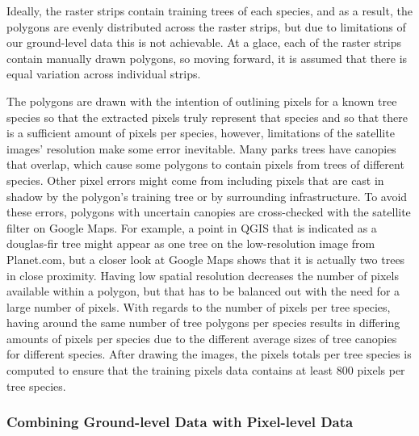 \documentclass[12pt,twoside]{reedthesis}
\begin{document}
Ideally, the raster strips contain training trees of each species, and as a result, the polygons are evenly distributed across the raster strips, but due to limitations of our ground-level data this is not achievable. At a glace, each of the raster strips contain manually drawn polygons, so moving forward, it is assumed that there is equal variation across individual strips.

The polygons are drawn with the intention of outlining pixels for a known tree species so that the extracted pixels truly represent that species and so that there is a sufficient amount of pixels per species, however, limitations of the satellite images' resolution make some error inevitable. Many parks trees have canopies that overlap, which cause some polygons to contain pixels from trees of different species. Other pixel errors might come from including pixels that are cast in shadow by the polygon's training tree or by surrounding infrastructure. To avoid these errors, polygons with uncertain canopies are cross-checked with the satellite filter on Google Maps. For example, a point in QGIS that is indicated as a douglas-fir tree might appear as one tree on the low-resolution image from Planet.com, but a closer look at Google Maps shows that it is actually two trees in close proximity. Having low spatial resolution decreases the number of pixels available within a polygon, but that has to be balanced out with the need for a large number of pixels. With regards to the number of pixels per tree species, having around the same number of tree polygons per species results in differing amounts of pixels per species due to the different average sizes of tree canopies for different species. After drawing the images, the pixels totals per tree species is computed to ensure that the training pixels data contains at least 800 pixels per tree species.

\hypertarget{combining-ground-level-data-with-pixel-level-data}{%
\subsubsection{Combining Ground-level Data with Pixel-level Data}\label{combining-ground-level-data-with-pixel-level-data}}
\end{document}
